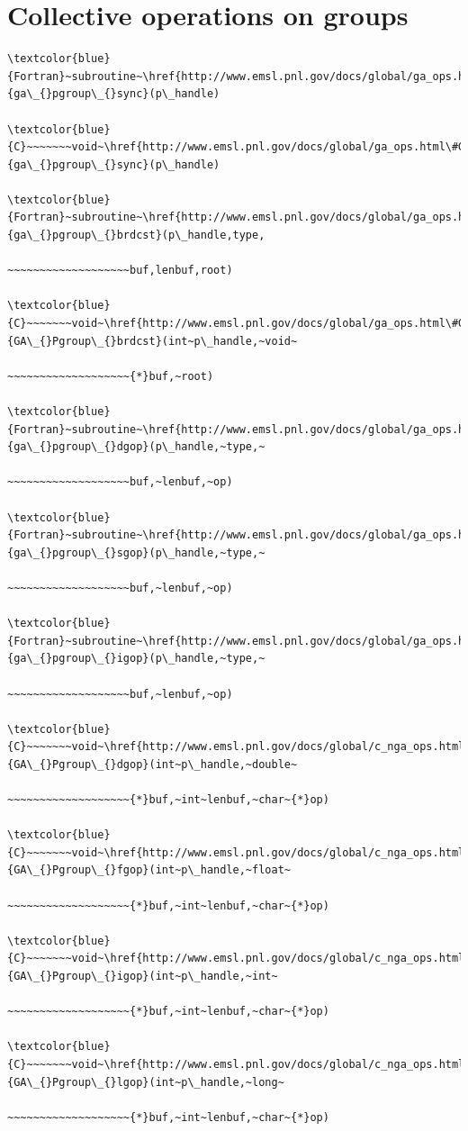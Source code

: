 \section{Collective operations on groups}
\begin{verbatim}
\textcolor{blue}{Fortran}~subroutine~\href{http://www.emsl.pnl.gov/docs/global/ga_ops.html\#GA_PGROUP_SYNC}{ga\_{}pgroup\_{}sync}(p\_handle)

\textcolor{blue}{C}~~~~~~~void~\href{http://www.emsl.pnl.gov/docs/global/ga_ops.html\#GA_PGROUP_SYNC}{ga\_{}pgroup\_{}sync}(p\_handle)

\textcolor{blue}{Fortran}~subroutine~\href{http://www.emsl.pnl.gov/docs/global/ga_ops.html\#GA_PGROUP_BRDCST}{ga\_{}pgroup\_{}brdcst}(p\_handle,type,

~~~~~~~~~~~~~~~~~~~buf,lenbuf,root)

\textcolor{blue}{C}~~~~~~~void~\href{http://www.emsl.pnl.gov/docs/global/ga_ops.html\#GA_PGROUP_BRDCST}{GA\_{}Pgroup\_{}brdcst}(int~p\_handle,~void~

~~~~~~~~~~~~~~~~~~~{*}buf,~root)

\textcolor{blue}{Fortran}~subroutine~\href{http://www.emsl.pnl.gov/docs/global/ga_ops.html\#GA_PGROUP_DGOP}{ga\_{}pgroup\_{}dgop}(p\_handle,~type,~

~~~~~~~~~~~~~~~~~~~buf,~lenbuf,~op)

\textcolor{blue}{Fortran}~subroutine~\href{http://www.emsl.pnl.gov/docs/global/ga_ops.html\#GA_PGROUP_SGOP}{ga\_{}pgroup\_{}sgop}(p\_handle,~type,~

~~~~~~~~~~~~~~~~~~~buf,~lenbuf,~op)

\textcolor{blue}{Fortran}~subroutine~\href{http://www.emsl.pnl.gov/docs/global/ga_ops.html\#GA_PGROUP_IGOP}{ga\_{}pgroup\_{}igop}(p\_handle,~type,~

~~~~~~~~~~~~~~~~~~~buf,~lenbuf,~op)

\textcolor{blue}{C}~~~~~~~void~\href{http://www.emsl.pnl.gov/docs/global/c_nga_ops.html\#GA_PGROUP_DGOP}{GA\_{}Pgroup\_{}dgop}(int~p\_handle,~double~

~~~~~~~~~~~~~~~~~~~{*}buf,~int~lenbuf,~char~{*}op)

\textcolor{blue}{C}~~~~~~~void~\href{http://www.emsl.pnl.gov/docs/global/c_nga_ops.html\#GA_PGROUP_FGOP}{GA\_{}Pgroup\_{}fgop}(int~p\_handle,~float~

~~~~~~~~~~~~~~~~~~~{*}buf,~int~lenbuf,~char~{*}op)

\textcolor{blue}{C}~~~~~~~void~\href{http://www.emsl.pnl.gov/docs/global/c_nga_ops.html\#GA_PGROUP_IGOP}{GA\_{}Pgroup\_{}igop}(int~p\_handle,~int~

~~~~~~~~~~~~~~~~~~~{*}buf,~int~lenbuf,~char~{*}op)

\textcolor{blue}{C}~~~~~~~void~\href{http://www.emsl.pnl.gov/docs/global/c_nga_ops.html\#GA_PGROUP_LGOP}{GA\_{}Pgroup\_{}lgop}(int~p\_handle,~long~

~~~~~~~~~~~~~~~~~~~{*}buf,~int~lenbuf,~char~{*}op)
\end{verbatim}
